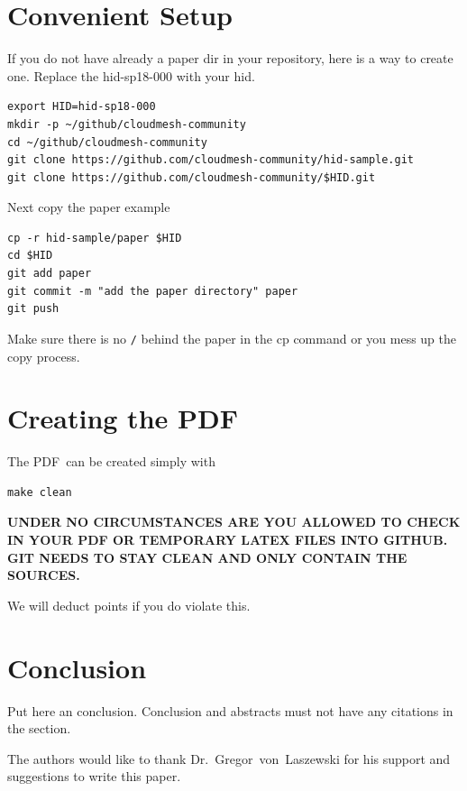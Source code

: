 \section{Convenient Setup}

If you do not have already a paper dir in your repository, here is a
way to create one. Replace the hid-sp18-000 with your hid.

\begin{verbatim}
export HID=hid-sp18-000
mkdir -p ~/github/cloudmesh-community
cd ~/github/cloudmesh-community
git clone https://github.com/cloudmesh-community/hid-sample.git
git clone https://github.com/cloudmesh-community/$HID.git
\end{verbatim}

Next copy the paper example

\begin{verbatim}
cp -r hid-sample/paper $HID
cd $HID
git add paper
git commit -m "add the paper directory" paper
git push
\end{verbatim}

Make sure there is no \verb|/| behind the paper in the cp command or you mess up the
copy process.


\section{Creating the PDF}

The PDF\ can be created simply with 

\begin{verbatim}
make clean
\end{verbatim}



{\bf UNDER NO CIRCUMSTANCES ARE YOU ALLOWED TO CHECK IN YOUR PDF OR
  TEMPORARY LATEX FILES INTO GITHUB. GIT NEEDS TO STAY CLEAN AND ONLY
  CONTAIN THE SOURCES.}

We will deduct points if you do violate this.

\section{Conclusion}

Put here an conclusion. Conclusion and abstracts must not have any
citations in the section.


\begin{acks}

  The authors would like to thank Dr.~Gregor~von~Laszewski for his
  support and suggestions to write this paper.

\end{acks}


 

